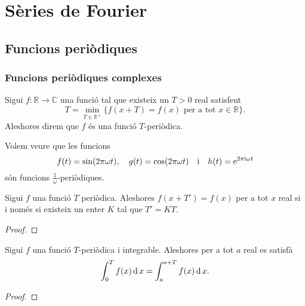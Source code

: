\documentclass[../../Main.tex]{subfiles}
\begin{document}
\chapter{Sèries de Fourier}
\section{Funcions periòdiques}
	\subsection{Funcions periòdiques complexes}
	\begin{definition}
		\label{def:funció periòdica}
		Sigui \(f\colon\mathbb{R}\longrightarrow\mathbb{C}\) una funció tal que existeix un \(T>0\) real satisfent
		\[T=\min_{T\in\mathbb{R}^{+}}\{f(x+T)=f(x)\text{ per a tot }x\in\mathbb{R}\}.\]
		Aleshores direm que \(f\) és una funció \(T\)-periòdica.
	\end{definition}
	\begin{example}
		\label{ex:periòde del sinus}
		\label{ex:periòde del cosinus}
		\label{ex:periòde de l'exponencial complexa}
		Volem veure que les funcions
		\[f(t)=\sin(2\pi\omega t),\quad g(t)=\cos(2\pi\omega t)\quad\text{i}\quad h(t)=\mathrm{e}^{2\pi\mathrm{i}\omega t}\]
		són funcions \(\frac{1}{\omega}\)-periòdiques.
		\begin{solution}
		\end{solution}
	\end{example}
	\begin{lemma}
		Sigui \(f\) una funció \(T\) periòdica. Aleshores \(f(x+T')=f(x)\) per a tot \(x\) real si i només si existeix un enter \(K\) tal que \(T'=KT\).
		\begin{proof}
		\end{proof}
	\end{lemma}
	\begin{proposition}
		\label{prop:podem desplaçar la integral d'una funció T periòdica}
		Sigui \(f\) una funció \(T\)-periòdica i integrable. Aleshores per a tot \(a\) real es satisfà
		\[\int_{0}^{T}f(x)\operatorname{d} x=\int_{a}^{a+T}f(x)\operatorname{d} x.\]
		\begin{proof}
		\end{proof}
	\end{proposition}
\end{document}
